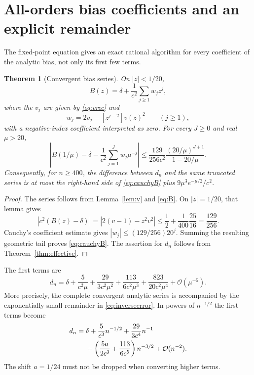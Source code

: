 \documentclass[11pt]{article}
\numberwithin{equation}{section}
\newtheorem{theorem}{Theorem}[section]
\theoremstyle{definition}
\theoremstyle{remark}
\newcommand{\OO}{\mathcal O}
\newcommand{\coeff}[2]{[#1^{#2}]}
\begin{document}
\section{All-orders bias coefficients and an explicit remainder}\label{sec:coefficients}
The fixed-point equation gives an exact rational algorithm for every
coefficient of the analytic bias, not only its first few terms.

\begin{theorem}[Convergent bias series]\label{thm:biasseries}
On $|z|<1/20$,
\begin{equation}\label{eq:Bseries}
 B(z)=\delta+\frac1{c^2}\sum_{j\ge1}w_jz^j,
\end{equation}
where the $v_j$ are given by \eqref{eq:vrec} and
\begin{equation}\label{eq:wrec}
 w_j=2v_j-\coeff{z}{j-2}v(z)^2\qquad(j\ge1),
\end{equation}
with a negative-index coefficient interpreted as zero.
For every $J\ge0$ and real $\mu>20$,
\begin{equation}\label{eq:cauchyB}
 \left|B(1/\mu)-\delta-\frac1{c^2}
             \sum_{j=1}^Jw_j\mu^{-j}\right|
 \le\frac{129}{256c^2}
       \frac{(20/\mu)^{J+1}}{1-20/\mu}.
\end{equation}
Consequently, for $n\ge400$, the difference between $d_n$ and the same
truncated series is at most the right-hand side of
\eqref{eq:cauchyB} plus $9\mu^3e^{-\mu/2}/c^2$.
\end{theorem}
\begin{proof}
The series follows from Lemma~\ref{lem:v} and \eqref{eq:B}. On
$|z|=1/20$, that lemma gives
\[
 |c^2(B(z)-\delta)|
 =|2(v-1)-z^2v^2|
 \le\frac12+\frac1{400}\frac{25}{16}
 =\frac{129}{256}.
\]
Cauchy's coefficient estimate gives
$|w_j|\le(129/256)20^j$. Summing the resulting geometric tail proves
\eqref{eq:cauchyB}. The assertion for $d_n$ follows from
Theorem~\ref{thm:effective}.
\end{proof}

The first terms are
\begin{equation}\label{eq:forwardterms}
 d_n=\delta+\frac5{c^2\mu}
 +\frac{29}{3c^2\mu^2}+\frac{113}{6c^2\mu^3}
 +\frac{823}{20c^2\mu^4}+\OO(\mu^{-5}).
\end{equation}
More precisely, the complete convergent analytic series is accompanied
by the exponentially small remainder in \eqref{eq:inverseerror}.
In powers of $n^{-1/2}$ the first terms become
\begin{align}\label{eq:npowers}
 d_n={}&\delta+\frac5{c^3}n^{-1/2}
 +\frac{29}{3c^4}n^{-1}\notag\\
 &+\left(\frac{5a}{2c^3}+\frac{113}{6c^5}\right)n^{-3/2}
 +\OO(n^{-2}).
\end{align}
The shift $a=1/24$ must not be dropped when converting higher terms.
\end{document}
